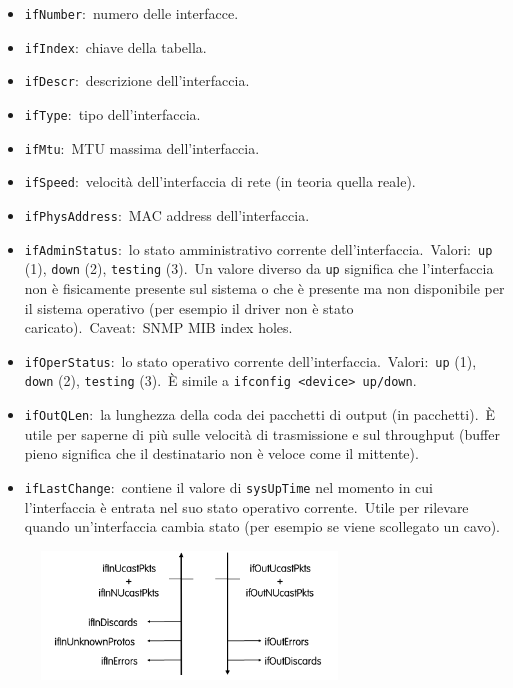 \begin{itemize}
    \item\texttt{ifNumber}:\ numero delle interfacce.
    \item\texttt{ifIndex}:\ chiave della tabella.
    \item\texttt{ifDescr}:\ descrizione dell'interfaccia.
    \item\texttt{ifType}:\ tipo dell'interfaccia.
    \item\texttt{ifMtu}:\ MTU massima dell'interfaccia.
    \item\texttt{ifSpeed}:\ velocità dell'interfaccia di rete (in teoria quella reale).
    \item\texttt{ifPhysAddress}:\ MAC address dell'interfaccia.
    \item\texttt{ifAdminStatus}:\ lo stato amministrativo corrente dell'interfaccia.\ Valori:\ \texttt{up} (1), \texttt{down} (2), \texttt{testing} (3).\ Un valore diverso da \texttt{up} significa che l'interfaccia non è fisicamente presente sul sistema o che è presente ma non disponibile per il sistema operativo (per esempio il driver non è stato caricato).\ Caveat:\ SNMP MIB index holes.
    \item\texttt{ifOperStatus}:\ lo stato operativo corrente dell'interfaccia.\ Valori:\ \texttt{up} (1), \texttt{down} (2), \texttt{testing} (3).\ È simile a \verb|ifconfig <device> up/down|.
    \item\texttt{ifOutQLen}:\ la lunghezza della coda dei pacchetti di output (in pacchetti).\ È utile per saperne di più sulle velocità di trasmissione e sul throughput (buffer pieno significa che il destinatario non è veloce come il mittente).
    \item\texttt{ifLastChange}:\ contiene il valore di \texttt{sysUpTime} nel momento in cui l'interfaccia è entrata nel suo stato operativo corrente.\ Utile per rilevare quando un'interfaccia cambia stato (per esempio se viene scollegato un cavo).
\end{itemize}

\begin{figure}[H]
    \centering
    \includegraphics[width=0.7\textwidth]{immagini/interface_group_diagram.png}
\end{figure}

